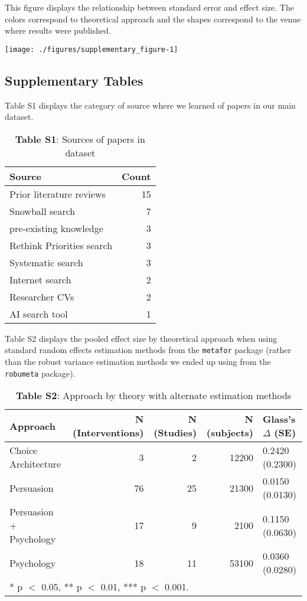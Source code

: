 \documentclass[sn-nature,referee,pdflatex]{sn-jnl}
\begin{document}
This figure displays the relationship between standard error and effect
size. The colors correspond to theoretical approach and the shapes
correspond to the venue where results were published.

\texttt{[image: ./figures/supplementary\_figure-1]}

\subsection{Supplementary Tables}\label{sec5.3}

Table S1 displays the category of source where we learned of papers in
our main dataset. \captionsetup[table]{labelformat=empty}

\begin{table}[!h]
\centering
\caption{\label{tab:supp_table_one}\textbf{Table S1}: Sources of papers in dataset}
\centering
\begin{tabular}[t]{lr}
\toprule
Source & Count\\
\midrule
Prior literature reviews & 15\\
Snowball search & 7\\
pre-existing knowledge & 3\\
Rethink Priorities search & 3\\
Systematic search & 3\\
\addlinespace
Internet search & 2\\
Researcher CVs & 2\\
AI search tool & 1\\
\bottomrule
\end{tabular}
\end{table}

Table S2 displays the pooled effect size by theoretical approach when
using standard random effects estimation methods from the
\texttt{metafor} package (rather than the robust variance estimation
methods we ended up using from the \texttt{robumeta} package).

\begin{table}[!h]
\centering
\caption{\label{tab:supp_table_two}\textbf{Table S2}: Approach by theory with alternate estimation methods }
\centering
\begin{tabular}[t]{lrrrl}
\toprule
Approach & N (Interventions) & N (Studies) & N (subjects) & Glass's $\Delta$ (SE)\\
\midrule
Choice Architecture & 3 & 2 & 12200 & 0.2420 (0.2300)\\
Persuasion & 76 & 25 & 21300 & 0.0150 (0.0130)\\
Persuasion + Psychology & 17 & 9 & 2100 & 0.1150 (0.0630)\\
Psychology & 18 & 11 & 53100 & 0.0360 (0.0280)\\
\bottomrule
\multicolumn{5}{l}{\rule{0pt}{1em}* p $<$ 0.05, ** p $<$ 0.01, *** p $<$ 0.001.}\\
\end{tabular}
\end{table}
\end{document}

